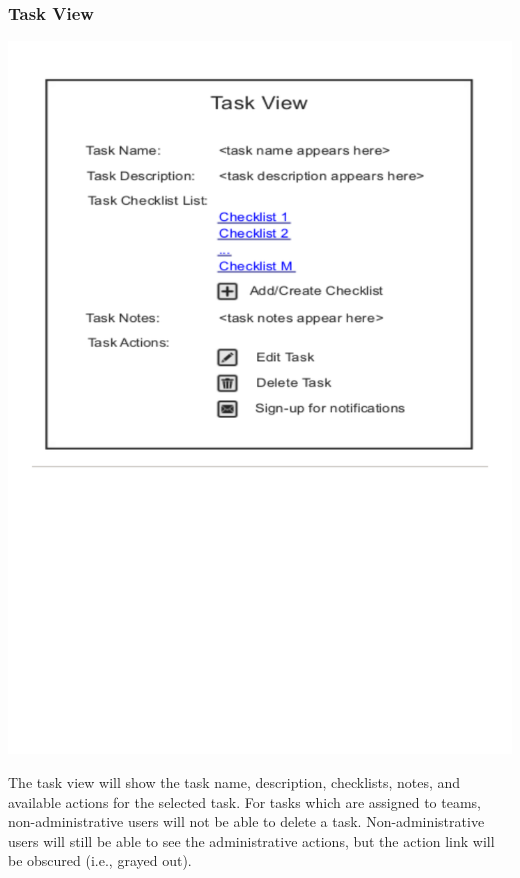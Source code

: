 \documentclass{article}
\begin{document}
\subsubsection{Task View}
\begin{center}
\includegraphics[trim = 0cm 12cm 0cm 0cm, clip=true, scale=0.7]{images/taskview}
\end{center}
The task view will show the task name, description, checklists, notes, and available actions for the selected task.
For tasks which are assigned to teams, non-administrative users will not be able to delete a task.
Non-administrative users will still be able to see the administrative actions, but the action link will be obscured (i.e., grayed out).
\end{document}
